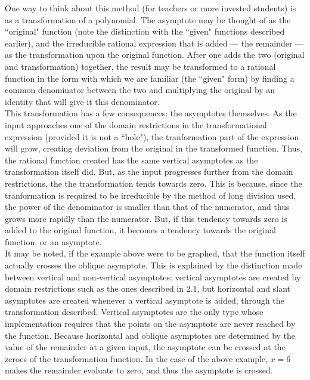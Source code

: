 \documentclass[12pt]{article}
\begin{document}
One way to think about this method (for teachers or more invested		%
students) is as a transformation of a polynomial. The asymptote may 
be thought of as the ``original" function (note the distinction with the
``given" functions described earlier), and the irreducible rational 
expression that is added --- the remainder --- as the transformation 
upon the original function. After one adds the two (original and 		%
transformation) together, the result may be transformed to a rational 
function in the form with which we are familiar (the ``given" form) by 
finding a common denominator between the two and multiplying the 	%
original by an identity that will give it this denominator. \\

This transformation has a few consequences:
the asymptotes themselves. As the input approaches one of the domain 
restrictions in the transformational expression (provided it is not a ``hole"),
the tranformation part of the expression will grow, creating deviation from
the original in the transformed function. Thus, the rational function created
has the same vertical asymptotes as the transformation itself did. But,
as the input progresses further from the domain restrictions, the 
the transformation tends towards zero. This is because, since the 
tranformation is required to be irreducible by the method of long 
division used, the power of the denominator is smaller than that of
the numerator, and thus grows more rapidly than the numerator.
But, if this tendency towards zero is added to the original function,
it becomes a tendency towards the original function, or an asymptote.\\

It may be noted, if the example above were to be graphed, that	%
the function itself actually crosses the oblique asymptote. This is 
explained by the distinction made between vertical and non-vertical
asymptotes: vertical asymptotes are created by domain restrictions
such as the ones described in 2.1, but horizontal and slant asymptotes
are created whenever a vertical asymptote is added, through the 
transformation described. Vertical asymptotes are the only type
whose implementation requires that the points on the asymptote
are never reached by the function. Because horizontal and oblique 
asymptotes are determined by the value of the remainder at a
given input, the asymptote can be crossed at the zeroes of the
transformation function. In the case of the above example, $x=6$
makes the remainder evaluate to zero, and thus the asymptote 
is crossed.\\
\end{document}
